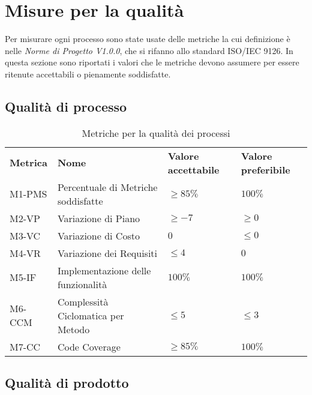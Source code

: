 \section{Misure per la qualità}
Per misurare ogni processo sono state usate delle metriche la cui definizione
 è nelle \textit{Norme di Progetto V1.0.0}, che si rifanno allo standard 
ISO/IEC 9126. In questa sezione sono riportati i valori che le metriche 
devono assumere per essere ritenute accettabili o pienamente soddisfatte.

\subsection{Qualità di processo}



\begin{table}[h]
    \begin{adjustbox}{width=\textwidth}
    \centering
    \renewcommand{\arraystretch}{1.5}
    \begin{tabular}{>{\centering\arraybackslash} m{2cm} >{\centering\arraybackslash} m{6cm} >{\centering\arraybackslash} m{3cm} >{\centering\arraybackslash} m{3cm}}
    \rowcolor[HTML]{bfbfbf} 
    \textbf{Metrica} & \textbf{Nome} & \textbf{Valore accettabile} & \textbf{Valore preferibile} \\
    M1-PMS & Percentuale di  Metriche soddisfatte & $\ge 85\%$ & $100\%$\\
    M2-VP & Variazione di Piano & $\ge -7$ & $\ge 0$\\
    M3-VC & Variazione di Costo & $0$ & $\le 0$\\
    M4-VR & Variazione dei Requisiti & $\le 4$ & $0$\\
    M5-IF & Implementazione delle funzionalità & $100\%$ & $100\%$\\
    M6-CCM & Complessità Ciclomatica per Metodo & $\le 5$ & $\le 3$\\
    M7-CC  & Code Coverage & $\ge 85\%$ & $100\%$               
    \end{tabular}
    \end{adjustbox}
    \caption{Metriche per la qualità dei processi}
\end{table}

\clearpage


\subsection{Qualità di prodotto}

